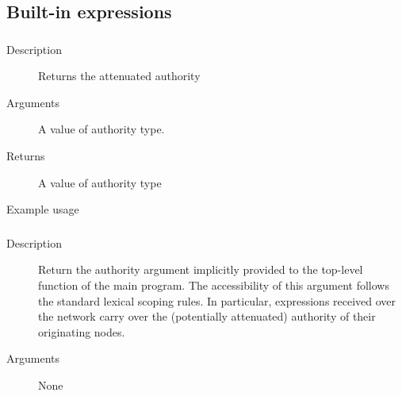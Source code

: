 \subsection{Built-in expressions}

\subsubsection{}
\begin{description}
    \item [Description] Returns the attenuated authority 
    \item [Arguments] A value of authority type.
    \item [Returns] A value of authority type
    \item [Example usage] 
\end{description}


\subsubsection{}

\begin{description}
    \item [Description] Return the authority argument implicitly provided to the top-level function of the main program.
The accessibility of this argument follows the standard lexical scoping rules. In particular, expressions received over the network carry over the (potentially attenuated) authority of their originating nodes.
    \item [Arguments] None
\end{description}

